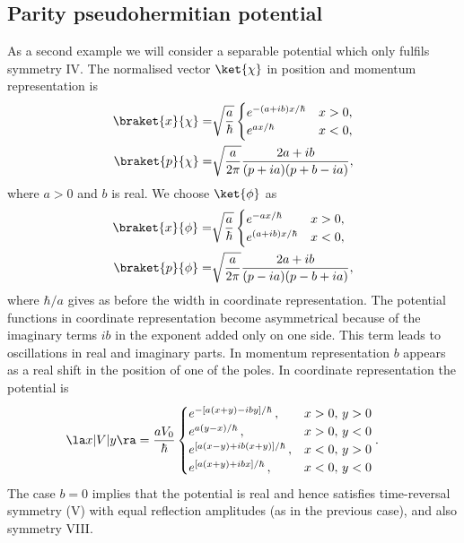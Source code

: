 %
\subsection{Parity pseudohermitian potential}
%
%
As a second example we will consider  a separable potential which only fulfils symmetry IV. The normalised vector $\ket{\chi}$ in position and momentum representation is
%
\begin{eqnarray}
\braket{x}{\chi}=& \sqrt{\frac{a}{\hbar}} \begin{cases}
e^{-(a+ib)x/\hbar}  &x>0,\\ e^{a x/\hbar} &x<0,
\end{cases} \nonumber \\
\braket{p}{\chi}=&  \sqrt{\frac{a}{2\pi}} \frac{2 a+ i b}{(p+ia)(p+b-i a)},
\end{eqnarray}
%
where $a>0$ and $b$ is real.
We choose $\ket{\phi}$ as
%
\begin{eqnarray}
\braket{x}{\phi}=& \sqrt{\frac{a}{\hbar}} \begin{cases}
e^{-a x/\hbar} &x>0,\\ e^{(a+i b)x/\hbar} &x<0,
\end{cases} \nonumber \\
\braket{p}{\phi}=& \sqrt{\frac{a}{2\pi}} \frac{2 a+i b}{(p-ia)(p-b+i a)},
\end{eqnarray}
%
where $\hbar/a$ gives as before the width in coordinate representation. The potential functions in coordinate representation become asymmetrical
because of the  imaginary terms  $ib$ in  the exponent added only on  one side. This term leads to oscillations in real and imaginary parts. In momentum representation $b$ appears as a real shift in the position of one of the poles.
%
In coordinate representation the potential is
%
\begin{eqnarray}
\hspace*{-0.6cm}\la x|V|y\ra=  \frac{aV_{0}}{\hbar} \begin{cases}
e^{-\left[a (x+y) - i b y\right]/\hbar} \, ,&x>0,\,y>0\\
e^{a(y-x)/\hbar} \,  ,&x>0, \,y<0\\
e^{\left[a(x-y)+i b(x+y)\right]/\hbar} \,  ,&x<0,\,y>0\\
e^{\left[a(x+y)+i b x\right]/\hbar} \,  ,&x<0,\,y<0
\end{cases}.
\label{Ppot}
\end{eqnarray}
%
The case $b=0$ implies that the potential is real and hence satisfies time-reversal symmetry (V) with equal reflection amplitudes (as in the previous case), and also symmetry VIII.


